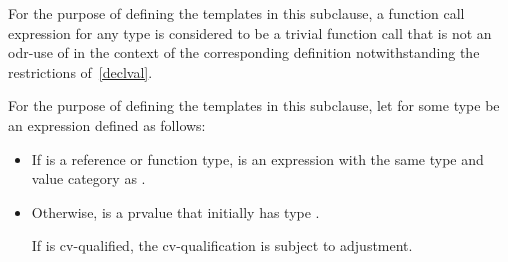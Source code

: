 \pnum
For the purpose of defining the templates in this subclause,
a function call expression  for any type 
is considered to be a trivial function call
that is not an odr-use of 
in the context of the corresponding definition
notwithstanding the restrictions of~\ref{declval}.

\pnum
For the purpose of defining the templates in this subclause,
let  for some type  be
an expression defined as follows:
\begin{itemize}
\item
If  is a reference or function type,
 is an expression
with the same type and value category as .
\item
Otherwise,  is a prvalue
that initially has type .
\begin{note}
If  is cv-qualified,
the cv-qualification is subject to adjustment.
\end{note}
\end{itemize}

